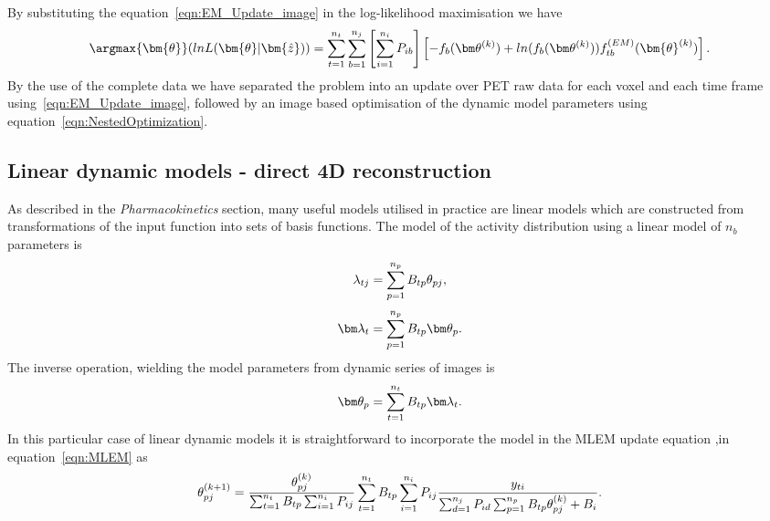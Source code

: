 By substituting the equation~\ref{eqn:EM_Update_image} in the log-likelihood maximisation we have
\begin{equation}
\argmax{\bm{\theta}}(lnL(\bm{\theta}|\bm{\hat{z}})) = 
\sum_{t=1}^{n_t} \sum_{b=1}^{n_j} \left[ \sum_{i=1}^{n_i}  P_{ib} \right]
\left[ -f_b(\bm\theta^{(k)}) + 
ln( f_b(\bm\theta^{(k)})) 
f_{tb}^{(EM)}(\bm{\theta}^{(k)})
\right] \\ .
\label{eqn:NestedOptimization}
\end{equation}
By the use of the complete data we have separated the problem into an update over PET raw data for each voxel and each time frame using~\ref{eqn:EM_Update_image}, followed by an image based optimisation of the dynamic model parameters using equation~\ref{eqn:NestedOptimization}. 

\subsection{Linear dynamic models - direct 4D reconstruction}
As described in the \textit{Pharmacokinetics} section, many useful models utilised in practice are linear models which are constructed from transformations of the input function into sets of basis functions.
The model of the activity distribution using a linear model of $n_b$ parameters is
\begin{equation}
\lambda_{tj} = \sum_{p=1}^{n_p} B_{tp}   \theta_{pj} \\, 
\label{eqn:2_3_LinearBasis}
\end{equation}
\begin{equation}
\bm\lambda_{t} = \sum_{p=1}^{n_p} B_{tp}  \bm\theta_{p}  \\.
\end{equation}
The inverse operation, wielding the model parameters from dynamic series of images is
\begin{equation}
\bm\theta_{p}  = \sum_{t=1}^{n_t} B_{tp} \bm\lambda_{t}  \\.
\end{equation}
In this particular case of linear dynamic models it is straightforward to incorporate the model in the MLEM update equation ,in equation~\ref{eqn:MLEM} as
%
%
%
\begin{equation}
\theta_{pj}^{(k+1)} = \frac{\theta_{pj}^{(k)}}
{\sum_{t=1}^{n_t} B_{tp} \sum_{i=1}^{n_i} P_{ij}} 
\sum_{t=1}^{n_t} B_{tp} \sum_{i=1}^{n_i} P_{ij}
\frac{y_{ti}}
{\sum_{d=1}^{n_j} P_{id} \sum_{p=1}^{n_p} B_{tp}\theta_{pj}^{(k)} + B_i } \\.
\label{eqn:4DMLEM}
\end{equation} 
%
%
%
